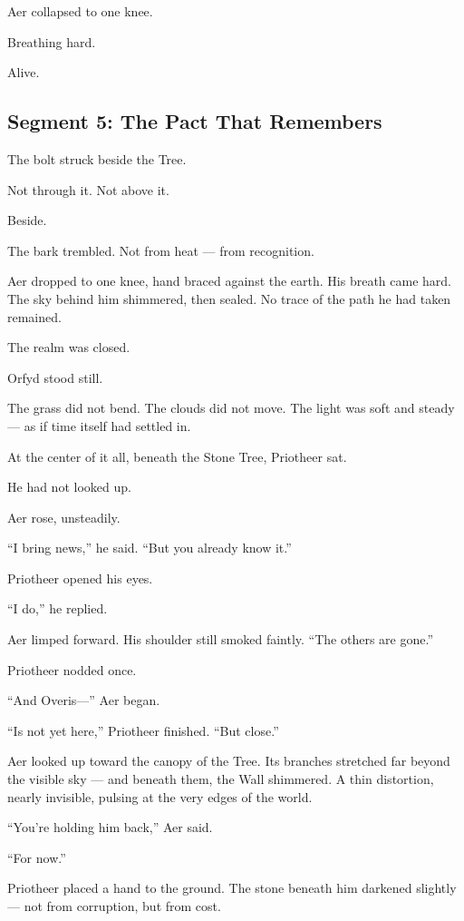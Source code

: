 \documentclass[9pt]{article}
\begin{document}
Aer collapsed to one knee.

Breathing hard.

Alive.


\newpage

\subsection*{Segment 5: The Pact That Remembers}

The bolt struck beside the Tree.

Not through it. Not above it.

Beside.

The bark trembled. Not from heat — from recognition.

Aer dropped to one knee, hand braced against the earth. His breath came hard. The sky behind him shimmered, then sealed. No trace of the path he had taken remained.

The realm was closed.

Orfyd stood still.

The grass did not bend. The clouds did not move. The light was soft and steady — as if time itself had settled in.

At the center of it all, beneath the Stone Tree, Priotheer sat.

He had not looked up.

Aer rose, unsteadily.

``I bring news,'' he said. ``But you already know it.''

Priotheer opened his eyes.

``I do,'' he replied.

Aer limped forward. His shoulder still smoked faintly. ``The others are gone.''

Priotheer nodded once.

``And Overis—'' Aer began.

``Is not yet here,'' Priotheer finished. ``But close.''

Aer looked up toward the canopy of the Tree. Its branches stretched far beyond the visible sky — and beneath them, the Wall shimmered. A thin distortion, nearly invisible, pulsing at the very edges of the world.

``You’re holding him back,'' Aer said.

``For now.''

Priotheer placed a hand to the ground. The stone beneath him darkened slightly — not from corruption, but from cost.
\end{document}
